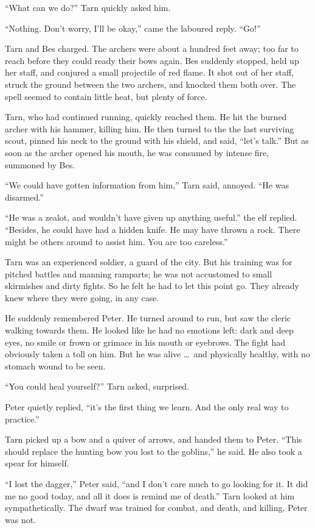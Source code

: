 ``What can we do?'' Tarn quickly asked him.

``Nothing.  Don't worry, I'll be okay,'' came the laboured reply.  ``Go!''

Tarn and Bes charged.  The archers were about a hundred feet away; too far to reach before they could ready their bows again.  Bes suddenly stopped, held up her staff, and conjured a small projectile of red flame.  It shot out of her staff, struck the ground between the two archers, and knocked them both over.  The spell seemed to contain little heat, but plenty of force.

Tarn, who had continued running, quickly reached them.  He hit the burned archer with his hammer, killing him.  He then turned to the the last surviving scout, pinned his neck to the ground with his shield, and said, ``let's talk.''  But as soon as the archer opened his mouth, he was consumed by intense fire, summoned by Bes.

``We could have gotten information from him,'' Tarn said, annoyed.  ``He was disarmed.''

``He was a zealot, and wouldn't have given up anything useful.''  the elf replied.  ``Besides, he could have had a hidden knife.  He may have thrown a rock.  There might be others around to assist him.  You are too careless.''

Tarn was an experienced soldier, a guard of the city.  But his training was for pitched battles and manning ramparts; he was not accustomed to small skirmishes and dirty fights.  So he felt he had to let this point go.  They already knew where they were going, in any case.

He suddenly remembered Peter.  He turned around to run, but saw the cleric walking towards them.  He looked like he had no emotions left: dark and deep eyes, no smile or frown or grimace in his mouth or eyebrows.  The fight had obviously taken a toll on him.  But he was alive \ldots\ and physically healthy, with no stomach wound to be seen.

``You could heal yourself?'' Tarn asked, surprised.

Peter quietly replied, ``it's the first thing we learn.  And the only real way to practice.''

Tarn picked up a bow and a quiver of arrows, and handed them to Peter.  ``This should replace the hunting bow you lost to the goblins,'' he said.  He also took a spear for himself.

``I lost the dagger,'' Peter said, ``and I don't care much to go looking for it.  It did me no good today, and all it does is remind me of death.''  Tarn looked at him sympathetically.  The dwarf was trained for combat, and death, and killing.  Peter was not.




